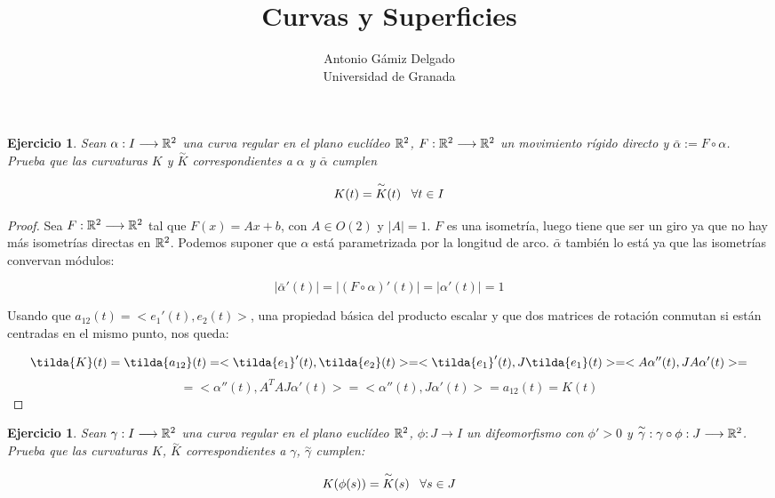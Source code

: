 \documentclass[12pt]{article}
\newtheorem{ejercicio}[theorem]{Ejercicio}
\theoremstyle{definition}
\theoremstyle{remark}
\begin{document}
\title{Curvas y Superficies}
\author{Antonio Gámiz Delgado\\ Universidad de Granada} 
 
\maketitle

\begin{ejercicio}
Sean $\alpha:I\longrightarrow \mathbb{R}^2$ una curva regular en el plano euclídeo $\mathbb{R}^2$, $F:\mathbb{R}^2\longrightarrow\mathbb{R}^2$ un movimiento rígido directo y $\bar{\alpha}:=F\circ\alpha$. Prueba que las curvaturas $K$ y $\overset{\sim}{K}$ correspondientes a $\alpha$ y $\bar{\alpha}$ cumplen 

\[
K(t)=\overset{\sim}{K}(t) \;\;\; \forall t \in I
\]
\end{ejercicio}

\begin{proof}

Sea $F : \mathbb{R}^2 \longrightarrow \mathbb{R}^2$ tal que $F(x)=Ax+b$, con $A\in O(2)$ y $|A|=1$. $F$ es una isometría, luego tiene que ser un giro ya que no hay más isometrías directas en $\mathbb{R}^2$. Podemos suponer que $\alpha$ está parametrizada por la longitud de arco. $\bar{\alpha}$ también lo está ya que las isometrías convervan módulos:

\[
|\bar{\alpha}'(t)|=|(F\circ\alpha)'(t)|=|\alpha'(t)|=1
\]

Usando que $a_{12}(t)=<e_1'(t),e_2(t)>$, una propiedad básica del producto escalar y que dos matrices de rotación conmutan si están centradas en el mismo punto, nos queda:

\[
\tilda{K}(t)=\tilda{a_{12}}(t)=<\tilda{e_1}'(t),\tilda{e_2}(t)>=<\tilda{e_1}'(t),J\tilda{e_1}(t)>=<A\alpha''(t),JA\alpha'(t)>=
\]
\[
=<\alpha''(t),A^TAJ\alpha'(t)>=<\alpha''(t),J\alpha'(t)>=a_{12}(t)=K(t)
\]

\end{proof}

\begin{ejercicio}
Sean $\gamma:I\longrightarrow\mathbb{R}^2$ una curva regular en el plano euclídeo $\mathbb{R}^2$, $\phi:J\longrightarrow I$ un difeomorfismo con $\phi'>0$ y $\overset{\sim}{\gamma}:\gamma\circ\phi:J\longrightarrow\mathbb{R}^2$. Prueba que las curvaturas $K$, $\overset{\sim}{K}$ correspondientes a $\gamma$, $\overset{\sim}{\gamma}$ cumplen:

\[
K(\phi(s))=\overset{\sim}{K}(s) \;\;\; \forall s \in J
\]

\end{ejercicio}
\end{document}
